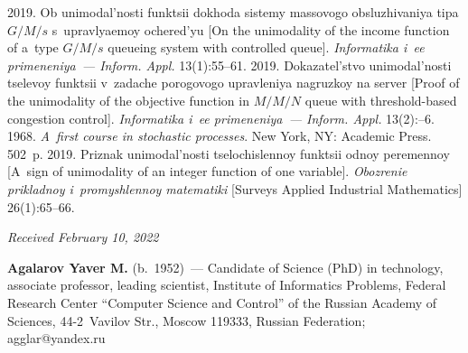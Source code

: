 \begin{multicols}{2}
{{\begin{thebibliography}{99}
   2019. Ob uni\-mo\-dal'\-nosti funk\-tsii do\-kho\-da 
  sis\-te\-my mas\-so\-vo\-go   obslu\-zhi\-va\-niya ti\-pa $G/M/s$ 
  s~uprav\-lya\-emoy oche\-red'\-yu [On the unimodality of the income function of a~type $G/M/s$ queueing system with 
controlled queue]. \textit{Informatika i~ee primeneniya~--- Inform. Appl.} 13(1):55--61. 
   2019. Do\-ka\-za\-tel'\-st\-vo uni\-mo\-dal'\-nosti tse\-le\-voy funk\-tsii 
  v~za\-da\-che po\-ro\-go\-vo\-go uprav\-le\-niya na\-gruz\-koy na ser\-ver [Proof of the unimodality of the objective function in 
$M/M/N$ queue with threshold-based congestion control]. \textit{Informatika i~ee primeneniya~--- Inform. Appl.} 
13(2):--6.
   1968. \textit{A~first course in stochastic processes}. New York, NY: Academic Press. 502~p.
   2019. Pri\-znak uni\-mo\-dal'\-nosti tse\-lo\-chis\-len\-noy funk\-tsii od\-noy pe\-re\-men\-noy [A~sign of 
unimodality of an integer function of one variable]. \textit{Obozrenie pri\-klad\-noy i~promyshlennoy matematiki} 
[Surveys Applied Industrial Mathematics] 26(1):65--66.

\end{thebibliography}

 }
 }

\end{multicols}

\vspace*{-6pt}

\hfill{\small\textit{Received February 10, 2022}}
   
   \Contrl
   
   \noindent
   \textbf{Agalarov Yaver M.} (b.\ 1952)~--- Candidate of Science (PhD) in technology, associate 
professor, leading scientist, Institute of Informatics Problems, Federal Research Center ``Computer Science 
and Control'' of the Russian Academy of Sciences, 44-2~Vavilov Str., Moscow 119333, Russian Federation; 
\mbox{agglar@yandex.ru}
  

\label{end\stat}

\renewcommand{\bibname}{\protect\rm Литература}    
   
